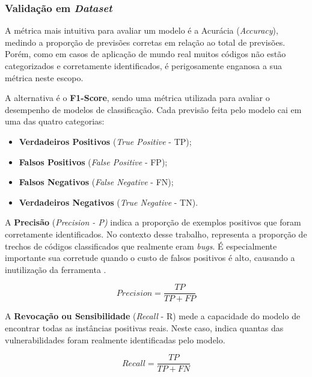 \documentclass[
    12pt,                %
    openright,           %
    oneside,             %
    a4paper,             %
    english,             %
    brazil               %
]{abntex2}
\begin{document}
\begin{itemize}
\subsubsection{Validação em \textit{Dataset}}
\label{sec:validadedataset}
\par
A métrica mais intuitiva para avaliar um modelo é a Acurácia (\textit{Accuracy}), medindo a proporção de previsões corretas em relação ao total de previsões.
Porém, como em casos de aplicação de mundo real muitos códigos não estão categorizados e corretamente identificados, é perigosamente enganosa a sua métrica neste escopo.
\par
A alternativa é o \textbf{F1-Score}, sendo uma métrica utilizada para avaliar o desempenho de modelos de classificação.
Cada previsão feita pelo modelo cai em uma das quatro categorias:

\begin{itemize}
  \item \textbf{Verdadeiros Positivos} (\textit{True Positive} - TP);
  \item \textbf{Falsos Positivos} (\textit{False Positive} - FP);
  \item \textbf{Falsos Negativos} (\textit{False Negative} - FN);
  \item \textbf{Verdadeiros Negativos} (\textit{True Negative} - TN).
\end{itemize}
\par
A \textbf{Precisão} (\textit{Precision - P)} indica a proporção de exemplos positivos que foram corretamente identificados.
No contexto desse trabalho, representa a proporção de trechos de códigos classificados que realmente eram \textit{bugs}.
É especialmente importante sua corretude quando o custo de falsos positivos é alto, causando a inutilização da ferramenta \cite{aho2007compilers}.

\begin{equation}
  \textit{Precision} = \frac{TP}{TP + FP}
\end{equation}

\vspace{\onelineskip}
\par
A \textbf{Revocação ou Sensibilidade} (\textit{Recall} - R) mede a capacidade do modelo de encontrar todas as instâncias positivas reais.
Neste caso, indica quantas das vulnerabilidades foram realmente identificadas pelo modelo.

\begin{equation}
  \textit{Recall} = \frac{TP}{TP + FN}
\end{equation}


\end{itemize}
\end{document}
